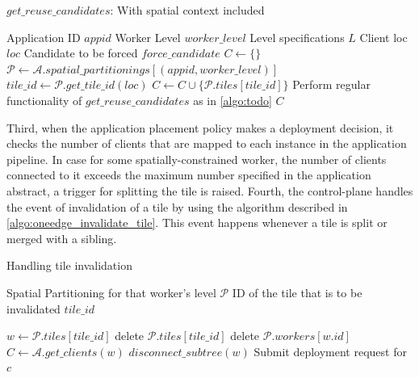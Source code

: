 \begin{algorithm}
\caption{$get\_reuse\_candidates$: With spatial context included}
\begin{algorithmic}[1]
\Require Application ID $appid$
\Require Worker Level $worker\_level$
\Require Level specifications $L$
\Require Client loc $loc$
\Require Candidate to be forced $force\_candidate$
\State $C \gets \{\}$
    \State $\mathcal{P} \gets \mathcal{A}.spatial\_partitionings[\left( appid, worker\_level\right)]$
    \State $tile\_id \gets \mathcal{P}.get\_tile\_id \left( loc \right)$
            \State $C \gets C \cup \{ \mathcal{P}.tiles[tile\_id] \}$
        \EndIf
    \EndIf
\Else
    \State Perform regular functionality of $get\_reuse\_candidates$ as in \cref{algo:todo}
\EndIf
\State \Return $C$
\end{algorithmic}
\end{algorithm}
Third, when the application placement policy makes a deployment decision, it checks the number of clients that are mapped to each instance in the application pipeline. In case for some spatially-constrained worker, the number of clients connected to it exceeds the maximum number specified in the application abstract, a trigger for splitting the tile is raised. Fourth, the control-plane handles the event of invalidation of a tile by using the algorithm described in \cref{algo:oneedge_invalidate_tile}. This event happens whenever a tile is split or merged with a sibling.

\begin{algorithm}
\caption{Handling tile invalidation}
\label{algo:oneedge_invalidate_tile}
\begin{algorithmic}[1]
\Require Spatial Partitioning for that worker's level $\mathcal{P}$
\Require ID of the tile that is to be invalidated $tile\_id$

\State $w \gets \mathcal{P}.tiles [tile\_id]$
\State delete $\mathcal{P}.tiles[tile\_id]$
\State delete $\mathcal{P}.workers[w.id]$
\State $C \gets \mathcal{A}.get\_clients \left( w \right)$ 
\State $disconnect\_subtree \left( w \right)$ 
    \State Submit deployment request for $c$
\EndFor
\end{algorithmic}
\end{algorithm}


